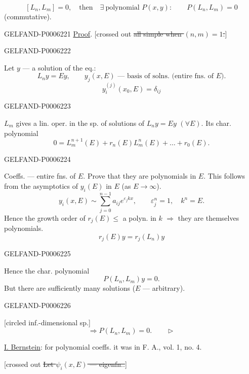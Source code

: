 \[
[L_n,L_m]=0,\quad\text{then}\quad\exists\ \text{polynomial }P(x,y):
\qquad P(L_n,L_m)=0
\]
(commutative).


\begin{GelfandAdjacentEvidence}{GELFAND-P000622}{1}
\underline{Proof}. [crossed out \sout{all simple when \((n,m)=1\).}]
\end{GelfandAdjacentEvidence}
\begin{GelfandAdjacentEvidence}{GELFAND-P000622}{2}

Let \(y\) — a solution of the eq.:
\[
L_ny=Ey,\qquad y_j(x,E)\text{ — basis of solns. (entire fns. of \(E\)).}
\]
\[
y_i^{(j)}(x_0,E)=\delta_{ij}
\]
\end{GelfandAdjacentEvidence}
\begin{GelfandAdjacentEvidence}{GELFAND-P000622}{3}

\(L_m\) gives a lin. oper. in the sp. of solutions of \(L_ny=Ey\) \((\forall E)\).
Its char. polynomial
\[
0=L_m^{n+1}(E)+r_n(E)L_m^n(E)+\ldots+r_0(E).
\]
\end{GelfandAdjacentEvidence}
\begin{GelfandAdjacentEvidence}{GELFAND-P000622}{4}

Coeffs. — entire fns. of \(E\).
Prove that they are polynomials in \(E\). This follows from the asymptotics of \(y_i(E)\) in \(E\) (as \(E\to\infty\)).
\[
y_i(x,E)\sim\sum_{j=0}^{n-1}a_{ij}e^{\varepsilon_jkx},
\qquad\varepsilon_j^n=1,\quad k^n=E.
\]
Hence the growth order of \(r_j(E)\le\) a polyn. in \(k\) \(\Rightarrow\) they are themselves polynomials.
\[
r_j(E)y=r_j(L_n)y
\]
\end{GelfandAdjacentEvidence}
\begin{GelfandAdjacentEvidence}{GELFAND-P000622}{5}

Hence the char. polynomial
\[
P(L_n,L_m)y=0.
\]
But there are sufficiently many solutions (\(E\) — arbitrary).
\end{GelfandAdjacentEvidence}
\begin{GelfandAdjacentEvidence}{GELFAND-P000622}{6}

[circled inf.-dimensional sp.]
\[
\Rightarrow P(L_n,L_m)=0.\qquad\triangleright
\]

\underline{I. Bernstein}: for polynomial coeffs. it was in F. A., vol. 1, no. 4.

[crossed out \sout{Let \(\psi_i(x,E)\) — eigenfn..}]
\end{GelfandAdjacentEvidence}
